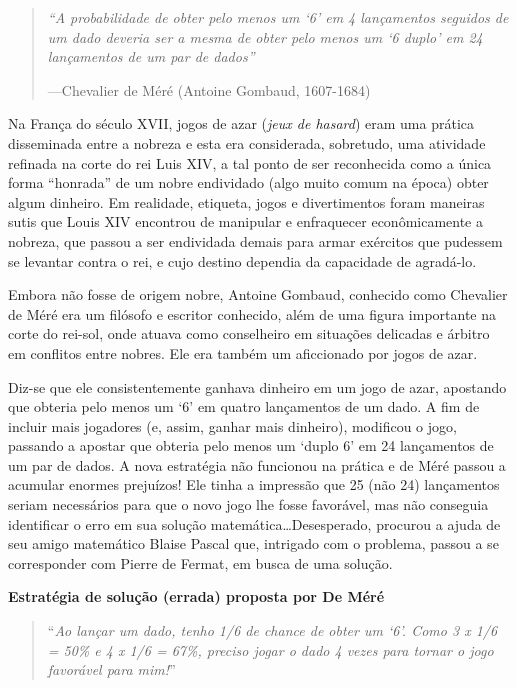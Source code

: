 \documentclass[
]{book}
\theoremstyle{definition}
\theoremstyle{definition}
\theoremstyle{definition}
\theoremstyle{remark}
\begin{document}
\begin{quote}
\emph{``A probabilidade de obter pelo menos um `6' em 4 lançamentos seguidos de um dado deveria ser a mesma de obter pelo menos um `6 duplo' em 24 lançamentos de um par de dados''}

---Chevalier de Méré (Antoine Gombaud, 1607-1684)
\end{quote}

Na França do século XVII, jogos de azar (\emph{jeux de hasard}) eram uma prática disseminada entre a nobreza e esta era considerada, sobretudo, uma atividade refinada na corte do rei Luis XIV, a tal ponto de ser reconhecida como a única forma ``honrada'' de um nobre endividado (algo muito comum na época) obter algum dinheiro. Em realidade, etiqueta, jogos e divertimentos foram maneiras sutis que Louis XIV encontrou de manipular e enfraquecer econômicamente a nobreza, que passou a ser endividada demais para armar exércitos que pudessem se levantar contra o rei, e cujo destino dependia da capacidade de agradá-lo.

Embora não fosse de origem nobre, Antoine Gombaud, conhecido como Chevalier de Méré era um filósofo e escritor conhecido, além de uma figura importante na corte do rei-sol, onde atuava como conselheiro em situações delicadas e árbitro em conflitos entre nobres. Ele era também um aficcionado por jogos de azar.

Diz-se que ele consistentemente ganhava dinheiro em um jogo de azar, apostando que obteria pelo menos um `6' em quatro lançamentos de um dado. A fim de incluir mais jogadores (e, assim, ganhar mais dinheiro), modificou o jogo, passando a apostar que obteria pelo menos um `duplo 6' em 24 lançamentos de um par de dados. A nova estratégia não funcionou na prática e de Méré passou a acumular enormes prejuízos! Ele tinha a impressão que 25 (não 24) lançamentos seriam necessários para que o novo jogo lhe fosse favorável, mas não conseguia identificar o erro em sua solução matemática\ldots Desesperado, procurou a ajuda de seu amigo matemático Blaise Pascal que, intrigado com o problema, passou a se corresponder com Pierre de Fermat, em busca de uma solução.

\textbf{Estratégia de solução (errada) proposta por De Méré}

\begin{quote}
``\emph{Ao lançar um dado, tenho 1/6 de chance de obter um `6'. Como 3 x 1/6 = 50\% e 4 x 1/6 = 67\%, preciso jogar o dado 4 vezes para tornar o jogo favorável para mim!}''
\end{quote}
\end{document}
